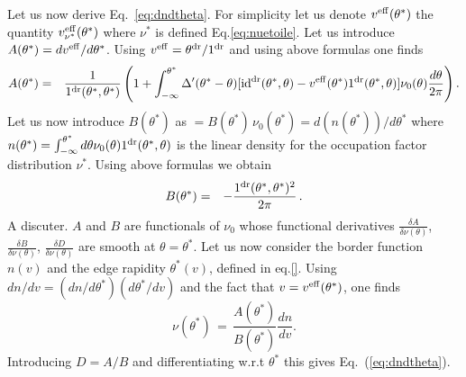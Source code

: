 \documentclass[submission, Phys]{SciPost}
\begin{document}
\begin{appendix}
Let us now derive Eq.~\eqref{eq:dndtheta}. For simplicity let us denote $v^{\rm eff}(\theta^*)$
the quantity $ v^{\rm eff}_{\nu^*}(\theta^*)$ where 
$\nu^*$ is defined Eq.\ref{eq:nuetoile}.
Let us introduce $A(\theta^*)=dv^{\rm eff}/d\theta^*$. Using $v^{\rm eff} = \theta^{\rm dr}/1^{\rm dr}$ and using above formulas one finds
\begin{eqnarray}
\nonumber   A (\theta^*)  &=& \frac{1}{1^{\rm dr} (\theta^*,\theta^*)}  \left( 1 + \int^{\theta^*}_{-\infty} \Delta'(\theta^* - \theta) [ {\rm id}^{\rm dr}(\theta^*,\theta) - v^{\rm eff}(\theta^*) 1^{\rm dr}(\theta^*,\theta)  ]  \nu_0(\theta) \frac{d\theta}{2\pi} \right) .
\end{eqnarray}
Let us now introduce $B(\theta^*)$ as $= %
  B(\theta^*) \, \nu_0 (\theta^*) %
  =
{ d ( n(\theta^*) ) }/{d \theta^*} $
where $n(\theta^*)=\int_{-\infty}^{\theta^*} d\theta \nu_0(\theta)1^{\rm dr}(\theta^*,\theta)$ is the linear density for the occupation factor distribution $\nu^*$.
Using above formulas we obtain
\begin{eqnarray}
  \nonumber   B(\theta^*)  &=& - \frac{1^{\rm dr} (\theta^*,\theta^*)^2}{2\pi}      \, .
\end{eqnarray}
{\color{blue} A discuter. $A$ and $B$ are functionals of $\nu_0$ whose functional derivatives $\frac{\delta A}{\delta \nu (\theta)}$, $\frac{\delta B}{\delta \nu (\theta)}$, $\frac{\delta D}{\delta \nu (\theta)}$ are smooth at $\theta = \theta^*$.}
Let us now consider the border function $n(v)$ and the edge rapidity $\theta^*(v)$, defined in eq.\ref{}. Using $dn/dv=(dn/d\theta^*)(d\theta^*/d v)$ and the fact that $v=v^{\rm eff}(\theta^*)$, one finds 
\begin{equation}
	\nu (\theta^*) \, = \, \frac{A(\theta^*)}{B(\theta^*)} \frac{dn}{dv} .
\end{equation}
Introducing 
$D=A/B$ and differentiating w.r.t $\theta^*$  this gives Eq.~(\ref{eq:dndtheta}).



\end{appendix}
\end{document}
